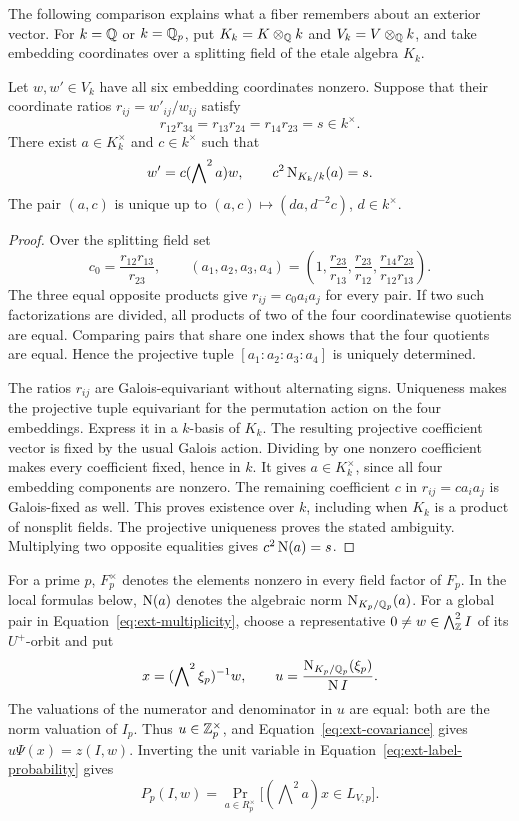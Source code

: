 The following comparison explains what a fiber remembers about an exterior
vector.  For \(k=\mathbb Q\) or \(k=\mathbb Q_p\), put \(K_k=K\otimes_\mathbb Q k\) and
\(V_k=V\otimes_\mathbb Q k\), and take embedding coordinates over a splitting
field of the etale algebra \(K_k\).

\begin{lemma}
\label{lem:ext-comparison}
Let \(w,w'\in V_k\) have all six embedding coordinates nonzero.  Suppose
that their coordinate ratios \(r_{ij}=w'_{ij}/w_{ij}\) satisfy
\[
 r_{12}r_{34}=r_{13}r_{24}=r_{14}r_{23}=s\in k^\times.
\]
There exist \(a\in K_k^\times\) and \(c\in k^\times\) such that
\[
 w'=c(\bigwedge\nolimits^2 a)w,\qquad c^2\operatorname{N}_{K_k/k}(a)=s.
\]
The pair \((a,c)\) is unique up to
\((a,c)\mapsto(da,d^{-2}c)\), \(d\in k^\times\).
\end{lemma}

\begin{proof}
Over the splitting field set
\[
 c_0=\frac{r_{12}r_{13}}{r_{23}},\qquad
 (a_1,a_2,a_3,a_4)=
 \left(1,\frac{r_{23}}{r_{13}},\frac{r_{23}}{r_{12}},
                 \frac{r_{14}r_{23}}{r_{12}r_{13}}\right).
\]
The three equal opposite products give \(r_{ij}=c_0a_i a_j\) for every
pair.  If two such factorizations are divided, all products of two of
the four coordinatewise quotients are equal.  Comparing pairs that
share one index shows that the four quotients are equal.  Hence the
projective tuple \([a_1:a_2:a_3:a_4]\) is uniquely determined.

The ratios \(r_{ij}\) are Galois-equivariant without alternating signs.
Uniqueness makes the projective tuple equivariant for the permutation
action on the four embeddings.  Express it in a \(k\)-basis of \(K_k\).
The resulting projective coefficient vector is fixed by the usual
Galois action.  Dividing by one nonzero coefficient makes every
coefficient fixed, hence in \(k\).  It gives \(a\in K_k^\times\), since
all four embedding components are nonzero.  The remaining coefficient
\(c\) in \(r_{ij}=c a_i a_j\) is Galois-fixed as well.  This proves
existence over \(k\), including when \(K_k\) is a product of nonsplit
fields.  The projective uniqueness proves the stated ambiguity.
Multiplying two opposite equalities gives \(c^2\operatorname{N}(a)=s\).
\end{proof}

For a prime \(p\), \(F_p^\times\) denotes the elements nonzero in every
field factor of \(F_p\).  In the local formulas below, \(\operatorname{N}(a)\) denotes
the algebraic norm \(\operatorname{N}_{K_p/\mathbb Q_p}(a)\).  For a global pair in
Equation~\eqref{eq:ext-multiplicity}, choose a representative
\(0\ne w\in\bigwedge^2_\mathbb Z I\) of its \(U^+\)-orbit and put
\[
 x=(\bigwedge\nolimits^2\xi_p)^{-1}w,\qquad
 u=\frac{\operatorname{N}_{K_p/\mathbb Q_p}(\xi_p)}{\operatorname{N} I}.
\]
The valuations of the numerator and denominator in \(u\) are equal:
both are the norm valuation of \(I_p\).  Thus \(u\in\mathbb Z_p^\times\), and
Equation~\eqref{eq:ext-covariance} gives \(u\Psi(x)=z(I,w)\).
Inverting the unit variable in Equation~\eqref{eq:ext-label-probability}
gives
\begin{equation}
 P_p(I,w)=
 \Pr_{a\in R_p^\times}\bigl[(\bigwedge\nolimits^2a)x\in L_{V,p}\bigr].
 \label{eq:ext-unit-membership}
\end{equation}

